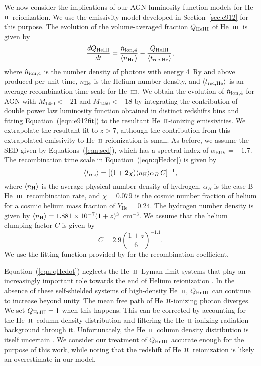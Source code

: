 \documentclass[fleqn,usenatbib]{mnras}
\def\nH{{\rm H}}
\def\nHe{{\rm He}}
\def\nHeIII{{\rm HeIII}}
\def\HeII{\hbox{He~$\scriptstyle\rm II$}}
\def\HeIII{\hbox{He~$\scriptstyle\rm III$}}
\def\HeIII{\hbox{He~$\scriptstyle\rm III$}}
\begin{document}
We now consider the implications of our AGN luminosity function models
for \HeII\ reionization.  We use the emissivity model developed in
Section~\ref{sec:e912} for this purpose.  The evolution of the
volume-averaged fraction $Q_\nHeIII$ of \HeIII\ is given by
\citep{2012ApJ...746..125H}
\begin{equation}
  {dQ_\nHeIII\over dt}={\dot n_{\rm ion,4}\over \langle n_\nHe \rangle} -{Q_\nHeIII\over
    \langle t_{\rm rec,He}\rangle},
  \label{eqn:qHedot}
\end{equation}
where $\dot n_{\rm ion,4}$ is the number density of photons with
energy 4~Ry and above produced per unit time, $n_\nHe$ is the Helium
number density, and $\langle t_{\rm rec,He}\rangle$ is an average
recombination time scale for \HeIII.  We obtain the evolution of $\dot
n_{\rm ion,4}$ for AGN with $M_\mathrm{1450}<-21$ and
$M_\mathrm{1450}<-18$ by integrating the contribution of double power
law luminosity function obtained in distinct redshifts bins and
fitting Equation~(\ref{eqn:e912fit}) to the resultant \HeII-ionizing
emissivities.  We extrapolate the resultant fit to $z>7$, although the
contribution from this extrapolated emissivity to \HeII-reionization
is small.  As before, we assume the SED given by
Equations~(\ref{eqn:sed}), which has a spectral index of
$\alpha_\mathrm{EUV}=-1.7$.  The recombination time scale in
Equation~(\ref{eqn:qHedot}) is given by
\begin{equation}
  \langle t_{\rm rec}\rangle=[(1+2\chi) \langle n_\nH\rangle \alpha_B\,C]^{-1},
  \label{eq:trec}
\end{equation}
where $\langle n_\nH\rangle$ is the average physical number density of
hydrogen, $\alpha_B$ is the case-B \HeIII\ recombination rate, and
$\chi=0.079$ is the cosmic number fraction of helium for a cosmic
helium mass fraction of $Y_\mathrm{He}=0.24$.  The hydrogen number
density is given by $\langle n_\nH\rangle=1.881\times
10^{-7}(1+z)^3$~cm$^{-3}$.  We assume that the helium clumping factor
$C$ is given by \citep{2015ApJ...813L...8M}
\begin{equation}
  C = 2.9\left(\frac{1+z}{6}\right)^{-1.1}.
\end{equation}
We use the fitting function provided by \citet{1997MNRAS.292...27H}
for the recombination coefficient.

Equation~(\ref{eqn:qHedot}) neglects the \HeII\ Lyman-limit systems
that play an increasingly important role towards the end of Helium
reionization \citep{2009MNRAS.395..736B, 2017ApJ...851...50M}.  In the
absence of these self-shielded systems of high-density \HeII,
$Q_\nHeIII$ can continue to increase beyond unity.  The mean free path
of \HeII-ionizing photon diverges.  We set $Q_\nHeIII=1$ when this
happens.  This can be corrected by accounting for the \HeII\ column
density distribution and filtering the \HeII-ionizing radiation
background through it.  Unfortunately, the \HeII\ column density
distribution is itself uncertain \citep{2018arXiv180104931P}.  We
consider our treatment of $Q_\nHeIII$ accurate enough for the purpose
of this work, while noting that the redshift of \HeII\ reionization is
likely an overestimate in our model.
\end{document}
